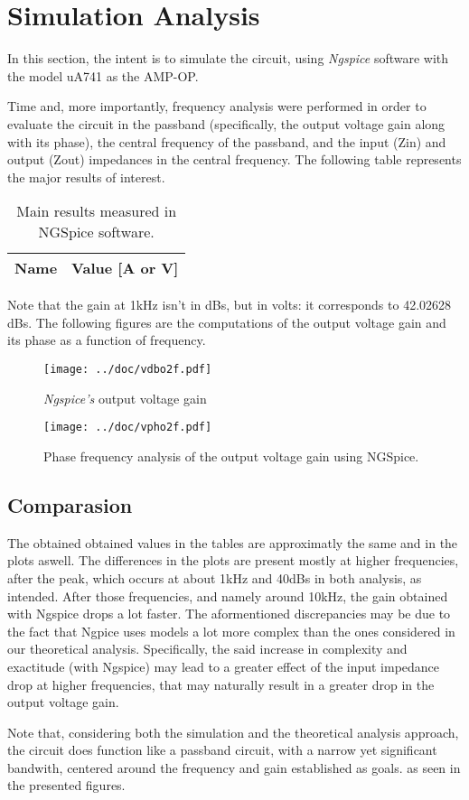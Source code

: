 \section{Simulation Analysis}
\label{sec:simulation}

In this section, the intent is to simulate the circuit, using \textit{Ngspice} software with the model uA741 as the AMP-OP.

Time and, more importantly, frequency analysis were performed in order to evaluate the circuit in the passband (specifically, the output voltage gain along with its phase), the central frequency of the passband, and the input (Zin) and output (Zout) impedances in the central frequency. The following table represents the major results of interest.

\begin{table}[h]
    \centering
    \begin{tabular}{|l|r|}
      \hline    
      {\bf Name} & {\bf Value [A or V]} \\ \hline
      
      
      
    \end{tabular}
    \caption{Main results measured in NGSpice software.}
 \end{table}

Note that the gain at 1kHz isn't in dBs, but in volts: it corresponds to 42.02628 dBs.
The following figures are the computations of the output voltage gain and its phase as a function of frequency.

\begin{figure}[!htb]
    \centering
    \texttt{[image: ../doc/vdbo2f.pdf]}
    \caption{\textit{Ngspice's} output voltage gain}
\end{figure}

\begin{figure}[!htb]
    \centering
    \texttt{[image: ../doc/vpho2f.pdf]}
    \caption{Phase frequency analysis of the output voltage gain using NGSpice.}
\end{figure}



\clearpage

\subsection{Comparasion}
\label{sec:comparasion}


The obtained obtained values in the tables are approximatly the same and in the plots aswell. The differences in the plots are present mostly at higher frequencies, after the peak, which occurs at about 1kHz and 40dBs in both analysis, as intended. After those frequencies, and namely around 10kHz, the gain obtained with Ngspice drops a lot faster. The aformentioned discrepancies may be due to the fact that Ngpice uses models a lot more complex than the ones considered in our theoretical analysis. Specifically, the said increase in complexity and exactitude (with Ngspice) may lead to a greater effect of the input impedance drop at higher frequencies, that may naturally result in a greater drop in the output voltage gain.

Note that, considering both the simulation and the theoretical analysis approach, the circuit does function like a passband circuit, with a narrow yet significant bandwith, centered around the frequency and gain established as goals. as seen in the presented figures.